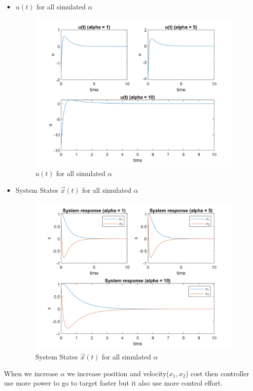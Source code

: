 \begin{itemize}
\begin{figure}[H]
\end{figure}
\item $u(t)$ for all simulated $\alpha$
\begin{figure}[H]
	\caption{$u(t)$ for all simulated $\alpha$}
	\centering
	\includegraphics[width=12cm]{../Code/Q3/figures/SubplotQ3_du.png}
\end{figure}
\item System States $\vec x(t)$ for all simulated $\alpha$
\begin{figure}[H]
	\caption{System States $\vec x(t)$ for all simulated $\alpha$}
	\centering
	\includegraphics[width=12cm]{../Code/Q3/figures/SubplotQ3_d.png}
\end{figure}
\end{itemize}
When we increase $\alpha$ we increase position and velocity($x_1, x_2$) cost then controller use more power to go to target faster but it also use more control effort.  